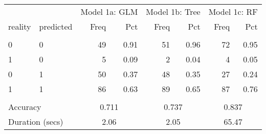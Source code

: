 \begin{tabular}{llrrrrrr}
   \toprule 
 & & 
                        \multicolumn{2}{l}{Model 1a: GLM} & 
                        \multicolumn{2}{l}{Model 1b: Tree} & 
                        \multicolumn{2}{l}{Model 1c: RF} 
                        \\ 
 \cmidrule(lr){3-4} 
                        \cmidrule(lr){5-6} 
                        \cmidrule(lr){7-8} 
                        
  reality & predicted & 
                        Freq & Pct & 
                        Freq & Pct & 
                        Freq & Pct 
                        \\ \hline \\[-1.8ex]  
 0 & 0 &  49 & 0.91 &  51 & 0.96 &  72 & 0.95 \\ 
  1 & 0 &   5 & 0.09 &   2 & 0.04 &   4 & 0.05 \\ 
  0 & 1 &  50 & 0.37 &  48 & 0.35 &  27 & 0.24 \\ 
  1 & 1 &  86 & 0.63 &  89 & 0.65 &  87 & 0.76 \\ 
   \hline \\[-1.8ex]  

              \multicolumn{2}{l}{Accuracy} & 
                   \multicolumn{2}{c}{0.711} & 
                   \multicolumn{2}{c}{0.737} & 
                   \multicolumn{2}{c}{0.837}
                   \\ 
 
                   \multicolumn{2}{l}{Duration (secs)} & 
                   \multicolumn{2}{c}{2.06} &
                   \multicolumn{2}{c}{2.05} &
                   \multicolumn{2}{c}{65.47}
                   \\ 
 \bottomrule 
\end{tabular}

